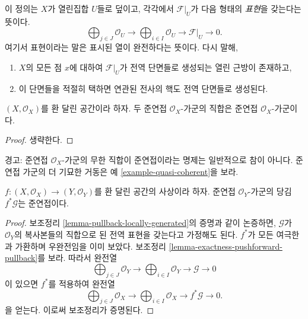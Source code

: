 \noindent
이 정의는 $X$가 열린집합 $U$들로 덮이고, 각각에서
$\mathcal{F}|_U$가 다음 형태의 {\it 표현}을 갖는다는 뜻이다.
$$
\bigoplus\nolimits_{j \in J}
\mathcal{O}_U
\longrightarrow
\bigoplus\nolimits_{i \in I}
\mathcal{O}_U
\longrightarrow
\mathcal{F}|_U
\longrightarrow
0.
$$
여기서 표현이라는 말은 표시된 열이 완전하다는 뜻이다. 다시 말해,
\begin{enumerate}
\item $X$의 모든 점 $x$에 대하여 $\mathcal{F}|_U$가 전역 단면들로
생성되는 열린 근방이 존재하고,
\item 이 단면들을 적절히 택하면 연관된 전사의 핵도
전역 단면들로 생성된다.
\end{enumerate}

\begin{lemma}
\label{lemma-direct-sum-quasi-coherent}
$(X, \mathcal{O}_X)$를 환 달린 공간이라 하자.
두 준연접 $\mathcal{O}_X$-가군의 직합은 준연접 $\mathcal{O}_X$-가군이다.
\end{lemma}

\begin{proof}
생략한다.
\end{proof}

\begin{remark}
\label{remark-infinite-direct-sum-quasi-coherent-not}
경고: 준연접 $\mathcal{O}_X$-가군의 무한 직합이 준연접이라는 명제는
일반적으로 참이 아니다. 준연접 가군의 더 기묘한 거동은
예 \ref{example-quasi-coherent}을 보라.
\end{remark}

\begin{lemma}
\label{lemma-pullback-quasi-coherent}
$f : (X, \mathcal{O}_X) \to (Y, \mathcal{O}_Y)$를
환 달린 공간의 사상이라 하자.
준연접 $\mathcal{O}_Y$-가군의 당김 $f^*\mathcal{G}$는 준연접이다.
\end{lemma}

\begin{proof}
보조정리 \ref{lemma-pullback-locally-generated}의 증명과 같이 논증하면,
$\mathcal{G}$가 $\mathcal{O}_Y$의 복사본들의 직합으로 된
전역 표현을 갖는다고 가정해도 된다.
$f^*$가 모든 여극한과 가환하며 우완전임을 이미 보았다.
보조정리 \ref{lemma-exactness-pushforward-pullback}를 보라.
따라서 완전열
$$
\bigoplus\nolimits_{j \in J}
\mathcal{O}_Y
\longrightarrow
\bigoplus\nolimits_{i \in I}
\mathcal{O}_Y
\longrightarrow
\mathcal{G}
\longrightarrow
0
$$
이 있으면 $f^*$를 적용하여 완전열
$$
\bigoplus\nolimits_{j \in J}
\mathcal{O}_X
\longrightarrow
\bigoplus\nolimits_{i \in I}
\mathcal{O}_X
\longrightarrow
f^*\mathcal{G}
\longrightarrow
0.
$$
을 얻는다. 이로써 보조정리가 증명된다.
\end{proof}

